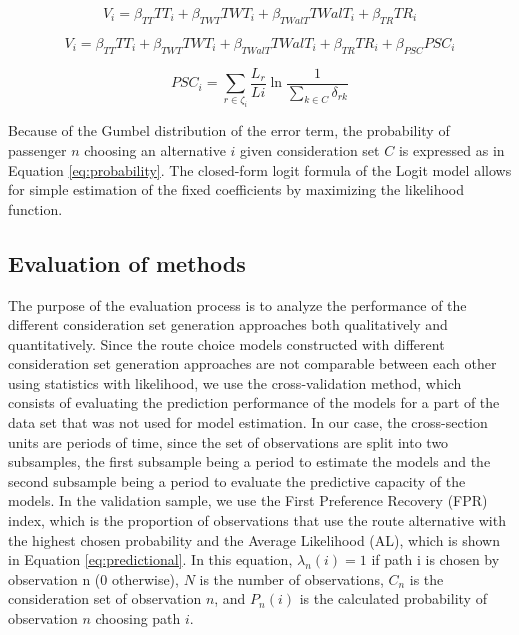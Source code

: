 \documentclass[12pt,a4paper]{article}
\begin{document}
\begin{equation} \label{eq:deterministiccomp}
V_{i} = \beta_{TT}TT_{i} + \beta_{TWT}TWT_{i} + \beta_{TWalT}TWalT_{i} + \beta_{TR}TR_{i}
\end{equation}

\begin{equation} \label{eq:deterministiccompps}
V_{i} = \beta_{TT}TT_{i} + \beta_{TWT}TWT_{i} + \beta_{TWalT}TWalT_{i} + \beta_{TR}TR_{i} + \beta_{PSC}PSC_{i}
\end{equation}

\begin{equation} \label{eq:pathsize}
PSC_{i} = \sum_{r \in \zeta_{i}}{\frac{L_{r}}{L{i}} \ln{\frac{1}{\sum_{k \in C} \delta_{rk}}}}
\end{equation}

Because of the Gumbel distribution of the error term, the probability of passenger $n$ choosing an alternative $i$ given consideration set $C$ is expressed as in Equation \ref{eq:probability}. The closed-form logit formula of the Logit model allows for simple estimation of the fixed coefficients by maximizing the likelihood function.

\subsection{Evaluation of methods}

The purpose of the evaluation process is to analyze the performance of the different consideration set generation approaches both qualitatively and quantitatively. Since the route choice models constructed with different consideration set generation approaches are not comparable between each other using statistics with likelihood, we use the cross-validation method, which consists of evaluating the prediction performance of the models for a part of the data set that was not used for model estimation. In our case, the cross-section units are periods of time, since the set of observations are split into two subsamples, the first subsample being a period to estimate the models and the second subsample being a period to evaluate the predictive capacity of the models. In the validation sample, we use the First Preference Recovery (FPR) index, which is the proportion of observations that use the route alternative with the highest chosen probability and the Average Likelihood (AL), which is shown in Equation \ref{eq:predictional}. In this equation, $\lambda_{n}(i)=1$ if path i is chosen by observation n (0 otherwise), $N$ is the number of observations, $C_{n}$ is the consideration set of observation $n$, and $P_{n} (i)$ is the calculated probability of observation $n$ choosing path $i$.
\end{document}
